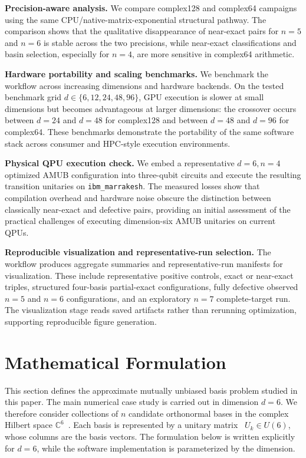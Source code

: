 \documentclass[a4paper,twocolumn,11pt,amsfonts,amssymb]{quantumarticle}
\begin{document}
\textbf{Precision-aware analysis.}
We compare complex128 and complex64 campaigns using the same CPU/native-matrix-exponential structural pathway. The comparison shows that the qualitative disappearance of near-exact pairs for \(n=5\) and \(n=6\) is stable across the two precisions, while near-exact classifications and basin selection, especially for \(n=4\), are more sensitive in complex64 arithmetic.

\textbf{Hardware portability and scaling benchmarks.}
We benchmark the workflow across increasing dimensions and hardware backends. On the tested benchmark grid \(d\in\{6,12,24,48,96\}\), GPU execution is slower at small dimensions but becomes advantageous at larger dimensions: the crossover occurs between \(d=24\) and \(d=48\) for complex128 and between \(d=48\) and \(d=96\) for complex64. These benchmarks demonstrate the portability of the same software stack across consumer and HPC-style execution environments.

\textbf{Physical QPU execution check.}
We embed a representative \(d=6,n=4\) optimized AMUB configuration into three-qubit circuits and execute the resulting transition unitaries on \texttt{ibm\_marrakesh}. The measured losses show that compilation overhead and hardware noise obscure the distinction between classically near-exact and defective pairs, providing an initial assessment of the practical challenges of executing dimension-six AMUB unitaries on current QPUs.

\textbf{Reproducible visualization and representative-run selection.}
The workflow produces aggregate summaries and representative-run manifests for visualization. These include representative positive controls, exact or near-exact triples, structured four-basis partial-exact configurations, fully defective observed \(n=5\) and \(n=6\) configurations, and an exploratory \(n=7\) complete-target run. The visualization stage reads saved artifacts rather than rerunning optimization, supporting reproducible figure generation.

\section{Mathematical Formulation}
\label{sec:mathematical-formulation}

This section defines the approximate mutually unbiased basis problem studied in this paper. The main numerical case study is carried out in dimension \(d=6\). We therefore consider collections of \(n\) candidate orthonormal bases in the complex Hilbert space \(\mathbb{C}^6\)~\cite{helmberg2008introHilbertspace}. Each basis is represented by a unitary matrix~\cite{littlewood1977theoryofgroupandmatrix} \(U_k \in U(6)\), whose columns are the basis vectors. The formulation below is written explicitly for \(d=6\), while the software implementation is parameterized by the dimension.
\end{document}
